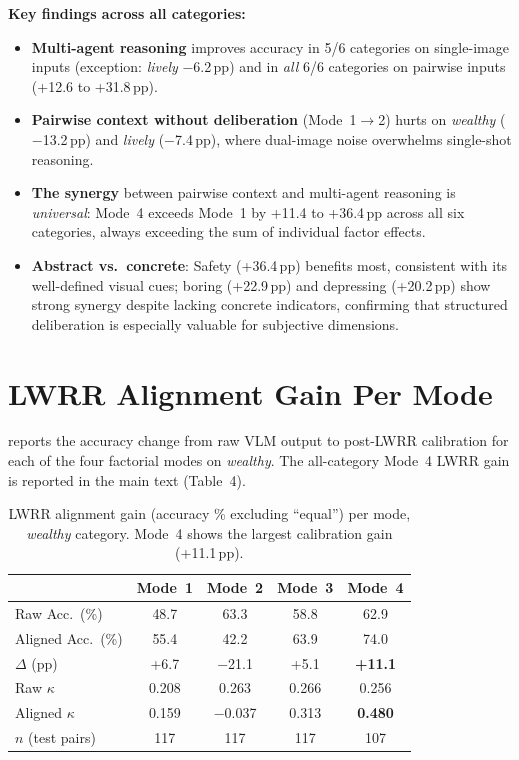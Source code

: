\documentclass[runningheads]{llncs}
\begin{document}
{\noindent\textbf{Key findings across all categories:}
\begin{itemize}
\item \textbf{Multi-agent reasoning} improves accuracy in 5/6 categories on single-image inputs (exception: \emph{lively} $-$6.2\,pp) and in \emph{all} 6/6 categories on pairwise inputs (+12.6 to +31.8\,pp).
\item \textbf{Pairwise context without deliberation} (Mode~1$\to$2) hurts on \emph{wealthy} ($-$13.2\,pp) and \emph{lively} ($-$7.4\,pp), where dual-image noise overwhelms single-shot reasoning.
\item \textbf{The synergy} between pairwise context and multi-agent reasoning is \emph{universal}: Mode~4 exceeds Mode~1 by +11.4 to +36.4\,pp across all six categories, always exceeding the sum of individual factor effects.
\item \textbf{Abstract vs.\ concrete}: Safety (+36.4\,pp) benefits most, consistent with its well-defined visual cues; boring (+22.9\,pp) and depressing (+20.2\,pp) show strong synergy despite lacking concrete indicators, confirming that structured deliberation is especially valuable for subjective dimensions.
\end{itemize}
}

\FloatBarrier
\section{LWRR Alignment Gain Per Mode}
\label{sec:vrm_gain}

 reports the accuracy change from raw VLM output to post-LWRR calibration for each of the four factorial modes on \emph{wealthy}.
The all-category Mode~4 LWRR gain is reported in the main text (Table~4).

\begin{table}[H]
\centering
\caption{LWRR alignment gain (accuracy \% excluding ``equal'') per mode, \emph{wealthy} category. Mode~4 shows the largest calibration gain (+11.1\,pp).}
\label{tab:vrm_gain}
\small
\begin{tabular}{lcccc}
\toprule
 & Mode~1 & Mode~2 & Mode~3 & Mode~4 \\
\midrule
Raw Acc.\ (\%)     & 48.7 & 63.3 & 58.8 & 62.9 \\
Aligned Acc.\ (\%) & 55.4 & 42.2 & 63.9 & 74.0 \\
$\Delta$ (pp)      & +6.7 & $-$21.1 & +5.1 & \textbf{+11.1} \\
\midrule
Raw $\kappa$       & 0.208 & 0.263 & 0.266 & 0.256 \\
Aligned $\kappa$   & 0.159 & $-$0.037 & 0.313 & \textbf{0.480} \\
$n$ (test pairs)   & 117 & 117 & 117 & 107 \\
\bottomrule
\end{tabular}
\end{table}
\end{document}
